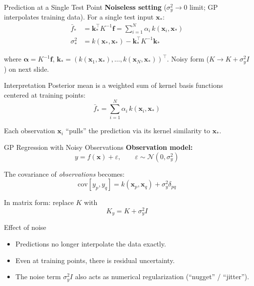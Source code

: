 \documentclass[aspectratio=169,11pt]{beamer}
\newcommand{\emphc}[1]{\textcolor{harvardcrimson}{#1}}
\newcommand{\x}{\bm{x}}
\begin{document}
\begin{frame}{Prediction at a Single Test Point}
\small
\textbf{Noiseless setting} ($\sigma_y^2 \to 0$ limit; GP interpolates training data). For a single test input $\x_*$:
\vspace{-4pt}
\begin{align}
\bar{f}_* &= \bm{k}_*^\top K^{-1} \bm{f} = \sum_{i=1}^{N} \alpha_i \, k(\x_i, \x_*) \\
\sigma_*^2 &= k(\x_*, \x_*) - \bm{k}_*^\top K^{-1} \bm{k}_*
\end{align}
\vspace{-12pt}

where $\bm{\alpha} = K^{-1}\bm{f}$, $\bm{k}_* = (k(\x_1, \x_*), \dots, k(\x_N, \x_*))^\top$. Noisy form ($K \to K + \sigma_y^2 I$) on next slide.

\begin{block}{Interpretation}
Posterior mean is a \emphc{weighted sum of kernel basis functions} centered at training points:
\vspace{-4pt}
\[
\bar{f}_* = \sum_{i=1}^N \alpha_i \, k(\x_i, \x_*)
\]
\vspace{-10pt}

Each observation $\x_i$ ``pulls'' the prediction via its kernel similarity to $\x_*$.
\end{block}
\end{frame}

\begin{frame}{GP Regression with Noisy Observations}
\textbf{Observation model:}
\[
y = f(\x) + \varepsilon, \qquad \varepsilon \sim \mathcal{N}(0, \sigma_y^2)
\]

\vspace{0.2cm}
The covariance of \emph{observations} becomes:
\[
\text{cov}[y_p, y_q] = k(\x_p, \x_q) + \sigma_y^2 \delta_{pq}
\]

\vspace{0.2cm}
In matrix form: replace $K$ with
\[
K_y = K + \sigma_y^2 I
\]

\vspace{0.3cm}
\begin{block}{Effect of noise}
\begin{itemize}
  \item Predictions no longer interpolate the data exactly.
  \item Even at training points, there is \emphc{residual uncertainty}.
  \item The noise term $\sigma_y^2 I$ also acts as \emphc{numerical regularization} (``nugget'' / ``jitter'').
\end{itemize}
\end{block}
\end{frame}
\end{document}
